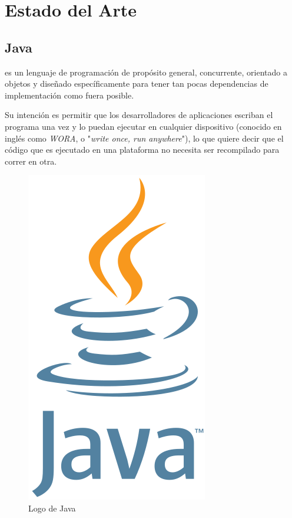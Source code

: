 
\chapter{Estado del Arte} %

\label{Chapter3} %


 \section{Java}

  es un lenguaje de programación de propósito general, concurrente, orientado a objetos y diseñado específicamente para tener tan pocas dependencias de implementación como fuera posible.

 Su intención es permitir que los desarrolladores de aplicaciones escriban el programa una vez y lo puedan ejecutar en cualquier dispositivo (conocido en inglés como \emph{WORA}, o "\emph{write once, run anywhere}"), lo que quiere decir que el código que es ejecutado en una plataforma no necesita ser recompilado para correr en otra. \emph{\parencite{Reference6}}

 \begin{figure}[ht]
   \centering
   \includegraphics[scale=0.4]{Figures/JavaLogo}
   \decoRule
   \caption[Java (Logo)]{Logo de Java}
   \label{fig:JavaLogo}
 \end{figure}

